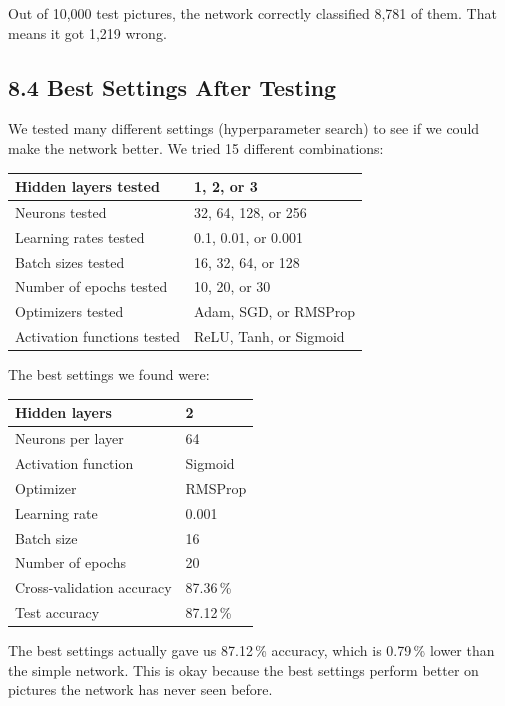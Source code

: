 \documentclass[11pt]{article}
\begin{document}
Out of 10,000 test pictures, the network correctly classified 8,781 of them. That means it got 1,219 wrong.

\subsection*{8.4 Best Settings After Testing}

We tested many different settings (hyperparameter search) to see if we could make the network better. We tried 15 different combinations:

\begin{center}
\begin{tabular}{|l|l|}
\hline
Hidden layers tested & 1, 2, or 3\\ \hline
Neurons tested & 32, 64, 128, or 256\\ \hline
Learning rates tested & 0.1, 0.01, or 0.001\\ \hline
Batch sizes tested & 16, 32, 64, or 128\\ \hline
Number of epochs tested & 10, 20, or 30\\ \hline
Optimizers tested & Adam, SGD, or RMSProp\\ \hline
Activation functions tested & ReLU, Tanh, or Sigmoid\\ \hline
\end{tabular}
\end{center}

The best settings we found were:

\begin{center}
\begin{tabular}{|l|l|}
\hline
Hidden layers & 2\\ \hline
Neurons per layer & 64\\ \hline
Activation function & Sigmoid\\ \hline
Optimizer & RMSProp\\ \hline
Learning rate & 0.001\\ \hline
Batch size & 16\\ \hline
Number of epochs & 20\\ \hline
Cross-validation accuracy & 87.36\,\%\\ \hline
Test accuracy & 87.12\,\%\\ \hline
\end{tabular}
\end{center}

The best settings actually gave us 87.12\,\% accuracy, which is 0.79\,\% lower than the simple network. This is okay because the best settings perform better on pictures the network has never seen before.
\end{document}
